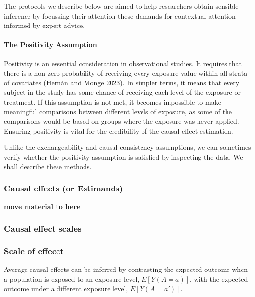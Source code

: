 \documentclass[
  singlecolumn]{article}
\let\oldparagraph\paragraph
\renewcommand{\paragraph}[1]{\oldparagraph{#1}\mbox{}}
\begin{document}
The protocols we describe below are aimed to help researchers obtain
sensible inference by focussing their attention these demands for
contextual attention informed by expert advice.

\hypertarget{the-positivity-assumption}{%
\paragraph{\texorpdfstring{\textbf{The Positivity
Assumption}}{The Positivity Assumption}}\label{the-positivity-assumption}}

Positivity is an essential consideration in observational studies. It
requires that there is a non-zero probability of receiving every
exposure value within all strata of covariates
(\protect\hyperlink{ref-hernuxe1n2023}{Hernán and Monge 2023}). In
simpler terms, it means that every subject in the study has some chance
of receiving each level of the exposure or treatment. If this assumption
is not met, it becomes impossible to make meaningful comparisons between
different levels of exposure, as some of the comparisons would be based
on groups where the exposure was never applied. Ensuring positivity is
vital for the credibility of the causal effect estimation.

Unlike the exchangeability and causal consistency assumptions, we can
sometimes verify whether the positivity assumption is satisfied by
inspecting the data. We shall describe these methods.

\hypertarget{causal-effects-or-estimands}{%
\subsubsection{Causal effects (or
Estimands)}\label{causal-effects-or-estimands}}

\textbf{move material to here}

\hypertarget{causal-effect-scales}{%
\subsubsection{Causal effect scales}\label{causal-effect-scales}}

\hypertarget{scale-of-effecct}{%
\subsubsection{Scale of effecct}\label{scale-of-effecct}}

Average causal effects can be inferred by contrasting the expected
outcome when a population is exposed to an exposure level,
\(E[Y(A = a)]\), with the expected outcome under a different exposure
level, \(E[Y(A=a')]\).
\end{document}
